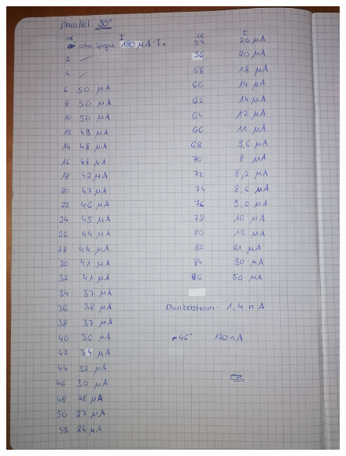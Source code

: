 \begin{figure}
    \centering
    \includegraphics[width=\textwidth]{content/Anhang 2.jpg}
\end{figure}
    
